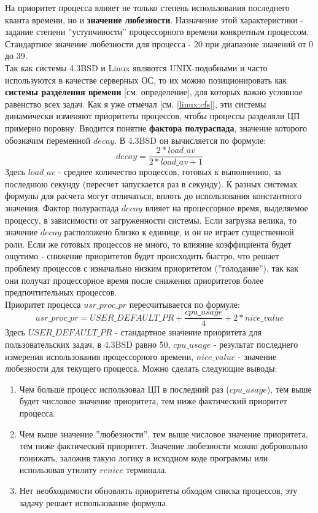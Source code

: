 На приоритет процесса влияет не только степень использования последнего кванта времени, но и \textbf{значение  любезности}. Назначение этой характеристики - задание степени ''уступчивости'' процессорного времени конкретным процессом. Стандартное значение любезности для процесса - 20 при диапазоне значений от 0 до 39.\\
Так как системы 4.3BSD и Linux являются UNIX-подобными и часто используются в качестве серверных ОС, то их можно позиционировать как \textbf{системы разделения времени} [см. определение], для которых важно условное равенство всех задач. Как я уже отмечал [см. \ref{linux:cfs}], эти системы динамически изменяют приоритеты процессов, чтобы процессы разделяли ЦП примерно поровну. Вводится понятие \textbf{фактора полураспада}, значение которого обозначим переменной $decay$. В 4.3BSD он вычисляется по формуле:
\begin{equation}
decay = \frac{2 * load\_av}{2 * load\_av + 1}  
\end{equation}
Здесь $load\_av$ - среднее количество процессов, готовых к выполнению, за последнюю секунду (пересчет запускается раз в секунду). К разных системах формулы для расчета могут отличаться, вплоть до использования константного значения. Фактор полураспада $decay$ влияет на процессорное время, выделяемое процессу, в зависимости от загруженности системы. Если загрузка велика, то значение $decay$ расположено близко к единице, и он не играет существенной роли. Если же готовых процессов не много, то влияние коэффициента будет ощутимо - снижение приоритетов будет происходить быстро, что решает проблему процессов с изначально низким приоритетом (''голодание''), так как они получат процессорное время после снижения приоритетов более предпочтительных  процессов. \\
\label{unix:priority}
Приоритет процесса $usr\_proc\_pr$ пересчитывается по формуле:
\begin{equation}
usr\_proc\_pr = USER\_DEFAULT\_PR + \frac{cpu\_usage}{4} + 2 * nice\_value
\end{equation}
Здесь $USER\_DEFAULT\_PR$ - стандартное значение приоритета для пользовательских задач, в 4.3BSD равно 50, $cpu\_usage$ -  результат последнего измерения использования процессорного времени, $nice\_value$ - значение любезности для текущего процесса. Можно сделать следующие выводы:
\begin{enumerate}[label=---]
\item Чем больше процесс использовал ЦП в последний раз ($cpu\_usage$), тем выше будет числовое значение приоритета, тем ниже фактический приоритет процесса.
\item Чем выше значение ''любезности'', тем выше числовое значение приоритета, тем ниже фактический приоритет. Значение любезности можно добровольно понижать, заложив такую логику в исходном коде программы или использовав утилиту $renice$ терминала.
\item Нет необходимости обновлять приоритеты обходом списка процессов, эту задачу решает использование формулы.
\end{enumerate}
